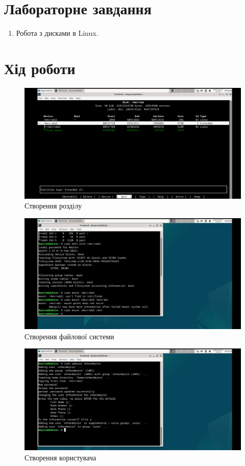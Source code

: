 \documentclass[oneside,14pt]{extarticle}
\begin{document}
\begin{normalsize}
    \section*{Лабораторне завдання}
	\begin{enumerate}
		\item Робота з дисками в Linux.
	\end{enumerate}

	\section*{Хід роботи}
	
	\begin{figure}[H]
		\centering
		\includegraphics[width=\columnwidth]{1}
		\caption{Створення розділу}
	\end{figure}
	
	\begin{figure}[H]
		\centering
		\includegraphics[width=\columnwidth]{2}
		\caption{Створення файлової системи}
	\end{figure}
	
		\begin{figure}[H]
		\centering
		\includegraphics[width=\columnwidth]{3}
		\caption{Створення користувача}
	\end{figure}
	

\end{normalsize}
\end{document}
